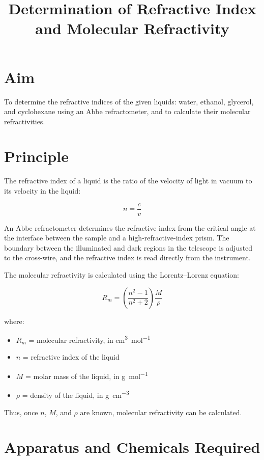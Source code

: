 \documentclass[12pt,a4paper]{article}
\title{\textbf{Determination of Refractive Index and Molecular Refractivity}}
\author{}
\date{}
\begin{document}
\maketitle

\section*{Aim}

To determine the refractive indices of the given liquids: water, ethanol, glycerol, and cyclohexane using an Abbe refractometer, and to calculate their molecular refractivities.

\section*{Principle}

The refractive index of a liquid is the ratio of the velocity of light in vacuum to its velocity in the liquid:

\[
n = \frac{c}{v}
\]

An Abbe refractometer determines the refractive index from the critical angle at the interface between the sample and a high-refractive-index prism. The boundary between the illuminated and dark regions in the telescope is adjusted to the cross-wire, and the refractive index is read directly from the instrument.

The molecular refractivity is calculated using the Lorentz--Lorenz equation:

\[
R_m =
\left(\frac{n^2-1}{n^2+2}\right)
\frac{M}{\rho}
\]

where:
\begin{itemize}
    \item $R_m$ = molecular refractivity, in \si{\cubic\centi\meter\per\mole}
    \item $n$ = refractive index of the liquid
    \item $M$ = molar mass of the liquid, in \si{\gram\per\mole}
    \item $\rho$ = density of the liquid, in \si{\gram\per\cubic\centi\meter}
\end{itemize}

Thus, once $n$, $M$, and $\rho$ are known, molecular refractivity can be calculated.

\section*{Apparatus and Chemicals Required}
\end{document}
